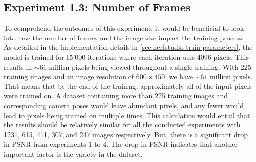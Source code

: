 

















\subsection{Experiment 1.3: Number of Frames}


To comprehend the outcomes of this experiment, it would be beneficial to look into how the number of frames and the image size impact the training process. As detailed in the implementation details in \autoref{sec:nerfstudio-train-parameters}, the model is trained for 15'000 iterations where each iteration uses 4096 pixels. This results in $\sim61$ million pixels being viewed throughout a single training. With 225 training images and an image resolution of $600 \times 450$, we have $\sim61$ million pixels. That means that by the end of the training, approximately all of the input pixels were trained on. A dataset containing more than 225 training images and corresponding camera poses would leave abundant pixels, and any fewer would lead to pixels being trained on multiple times. This calculation would entail that the results should be relatively similar for all the conducted experiments with 1231, 615, 411, 307, and 247 images respectively. But, there is a significant drop in PSNR from experiments 1 to 4. The drop in PSNR indicates that another important factor is the variety in the dataset.














